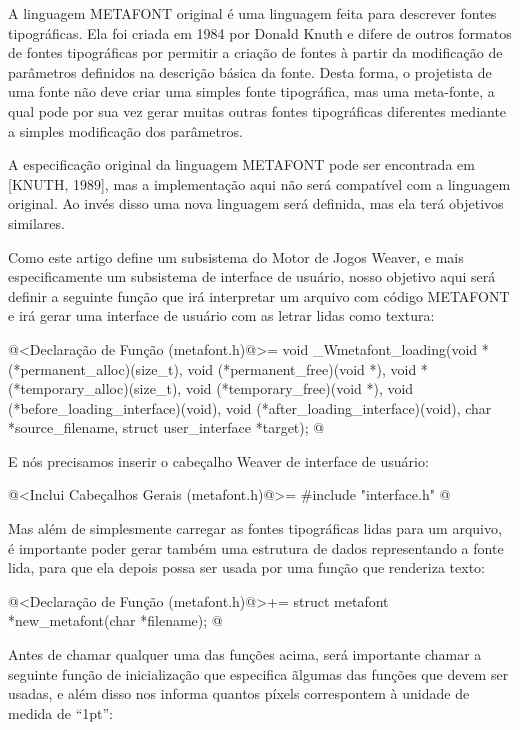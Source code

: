 
A linguagem METAFONT original é uma linguagem feita para descrever
fontes tipográficas. Ela foi criada em 1984 por Donald Knuth e difere
de outros formatos de fontes tipográficas por permitir a criação de
fontes à partir da modificação de parâmetros definidos na descrição
básica da fonte. Desta forma, o projetista de uma fonte não deve criar
uma simples fonte tipográfica, mas uma meta-fonte, a qual pode por sua
vez gerar muitas outras fontes tipográficas diferentes mediante a
simples modificação dos parâmetros.

A especificação original da linguagem METAFONT pode ser encontrada em
[KNUTH, 1989], mas a implementação aqui não será compatível com a
linguagem original. Ao invés disso uma nova linguagem será definida,
mas ela terá objetivos similares.

Como este artigo define um subsistema do Motor de Jogos Weaver, e mais
especificamente um subsistema de interface de usuário, nosso objetivo
aqui será definir a seguinte função que irá interpretar um arquivo com
código METAFONT e irá gerar uma interface de usuário com as letrar
lidas como textura:

\iniciocodigo
@<Declaração de Função (metafont.h)@>=
void _Wmetafont_loading(void *(*permanent_alloc)(size_t),
		      void (*permanent_free)(void *),
		      void *(*temporary_alloc)(size_t),
		      void (*temporary_free)(void *),
		      void (*before_loading_interface)(void),
		      void (*after_loading_interface)(void),
		      char *source_filename,
                      struct user_interface *target);
@
\fimcodigo

E nós precisamos inserir o cabeçalho Weaver de interface de usuário:

\iniciociodigo
@<Inclui Cabeçalhos Gerais (metafont.h)@>=
#include "interface.h"
@
\fimcodigo

Mas além de simplesmente carregar as fontes tipográficas lidas para um
arquivo, é importante poder gerar também uma estrutura de dados
representando a fonte lida, para que ela depois possa ser usada por
uma função que renderiza texto:

\iniciocodigo
@<Declaração de Função (metafont.h)@>+=
struct metafont *new_metafont(char *filename);
@
\fimcodigo

Antes de chamar qualquer uma das funções acima, será importante chamar
a seguinte função de inicialização que especifica ãlgumas das funções
que devem ser usadas, e além disso nos informa quantos píxels
correspontem à unidade de medida de ``1pt'':

